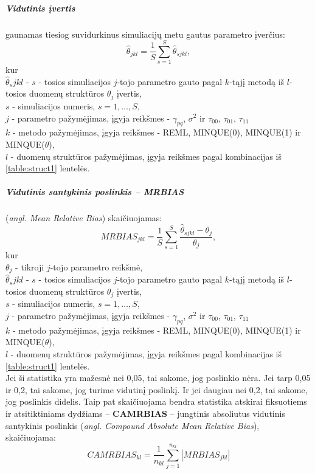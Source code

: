 \documentclass[12pt,a4paper]{article}
\begin{document}
\subparagraph{Vidutinis įvertis} gaunamas tiesiog suvidurkinus simuliacijų metu gautus parametro įverčius:
\[
\hat{\theta}_{jkl}=\frac{1}{S}\sum_{s=1}^S\hat{\theta}_{sjkl},
\]
kur \\
$\hat{\theta}_sjkl$ - $s$ - tosios simuliacijos $j$-tojo parametro gauto pagal $k$-tąjį metodą iš $l$-tosios duomenų struktūros $\theta_j$ įvertis,\\
$s$ - simuliacijos numeris, $s=1,\dots,S$,\\
$j$ - parametro pažymėjimas, įgyja reikšmes - $\gamma_{pq}$, $\sigma^2$ ir $\tau_{00}$,  $\tau_{01}$,  $\tau_{11}$\\
$k$ - metodo pažymėjimas, įgyja reikšmes - REML, MINQUE(0), MINQUE(1) ir MINQUE($\theta$),\\
$l$ - duomenų struktūros pažymėjimas, įgyja reikšmes pagal kombinacijas iš \ref{table:struct1} lentelės.\\

\subparagraph{Vidutinis santykinis poslinkis -- MRBIAS} (\textit{angl. Mean Relative Bias}) skaičiuojamas:
\[
MRBIAS_{jkl}=\frac{1}{S}\sum_{s=1}^S\frac{\hat{\theta}_{sjkl}-\theta_j}{\theta_j},
\]
kur \\
$\theta_j$ - tikroji $j$-tojo parametro reikšmė, \\
$\hat{\theta}_sjkl$ - $s$ - tosios simuliacijos $j$-tojo parametro gauto pagal $k$-tąjį metodą iš $l$-tosios duomenų struktūros $\theta_j$ įvertis,\\
$s$ - simuliacijos numeris, $s=1,\dots,S$,\\
$j$ - parametro pažymėjimas, įgyja reikšmes - $\gamma_{pq}$, $\sigma^2$ ir $\tau_{00}$,  $\tau_{01}$,  $\tau_{11}$\\
$k$ - metodo pažymėjimas, įgyja reikšmes - REML, MINQUE(0), MINQUE(1) ir MINQUE($\theta$),\\
$l$ - duomenų struktūros pažymėjimas, įgyja reikšmes pagal kombinacijas iš \ref{table:struct1} lentelės.\\
\indent Jei ši statistika yra mažesnė nei 0,05, tai sakome, jog poslinkio nėra. Jei tarp 0,05 ir 0,2, tai sakome, jog turime vidutinį poslinkį. Ir jei daugiau nei 0,2, tai sakome, jog poslinkis didelis. Taip pat skaičiuojama bendra statistika atskirai fiksuotiems ir atsitiktiniams dydžiams -- \textbf{CAMRBIAS} -- jungtinis absoliutus vidutinis santykinis poslinkis (\textit{angl. Compound Absolute Mean Relative Bias}), skaičiuojama:
\[
CAMRBIAS_{kl}=\frac{1}{n_{kl}}\sum_{j=1}^{n_{kl}}\left|MRBIAS_{jkl}\right|
\]
\end{document}
